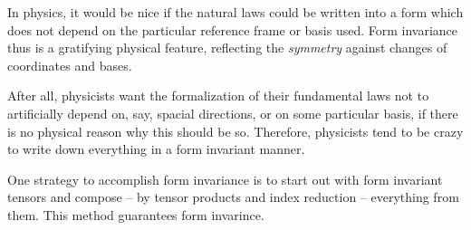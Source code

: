In physics, it would be nice if the natural laws could be written into a
form which does not depend on the particular reference frame or  basis
used.
Form invariance thus is a gratifying physical feature, reflecting the
{\em symmetry} against changes of coordinates and bases.

After all, physicists want the formalization of their fundamental laws not to artificially depend on,
say, spacial directions, or on some particular basis, if there is no physical reason why this should be so.
Therefore, physicists tend to be crazy to write down everything in a
form invariant manner.

One strategy to accomplish  form invariance  is to start out with form invariant
tensors and compose -- by tensor products and index reduction -- everything from them. This method guarantees form
invarince.

